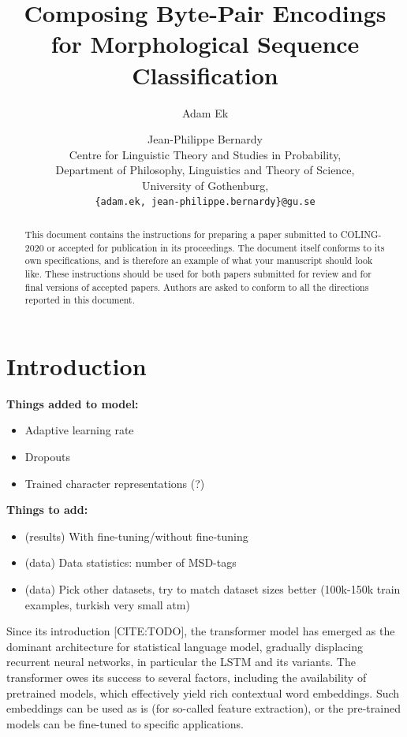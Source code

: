 \documentclass[11pt]{article}
\title{Composing Byte-Pair Encodings for Morphological Sequence Classification}
\author{Adam Ek \and Jean-Philippe Bernardy\\
	Centre for Linguistic Theory and Studies in Probability,\\
	Department of Philosophy, Linguistics and Theory of Science,\\
	University of Gothenburg,\\
	\texttt{\{adam.ek, jean-philippe.bernardy\}@gu.se}}
\date{}
\begin{document}
	\maketitle
	
	\begin{abstract}
		This document contains the instructions for preparing a paper submitted
		to COLING-2020 or accepted for publication in its proceedings. The document itself
		conforms to its own specifications, and is therefore an example of
		what your manuscript should look like. These instructions should be
		used for both papers submitted for review and for final versions of
		accepted papers. Authors are asked to conform to all the directions
		reported in this document.
	\end{abstract}
	
	\section{Introduction}
	\label{intro}
	
	\textbf{Things added to model:}
	\begin{itemize}
		\item Adaptive learning rate
		\item Dropouts
		\item Trained character representations (?)
	\end{itemize}
	
	\textbf{Things to add:}
	\begin{itemize}
		\item (results) With fine-tuning/without fine-tuning
		\item (data) Data statistics: number of MSD-tags 
		\item (data) Pick other datasets, try to match dataset sizes better (100k-150k train examples, turkish very small atm)
	\end{itemize}

            Since its introduction [CITE:TODO], the transformer model
     \citep{vaswani2017attention} has emerged as the dominant
     architecture for statistical language model, gradually displacing
     recurrent neural networks, in particular the LSTM and its
     variants. The transformer owes its success to several factors,
     including the availability of pretrained models, which
     effectively yield rich contextual word embeddings. Such
     embeddings can be used as is (for so-called feature extraction),
     or the pre-trained models can be fine-tuned to specific
     applications.
\end{document}
